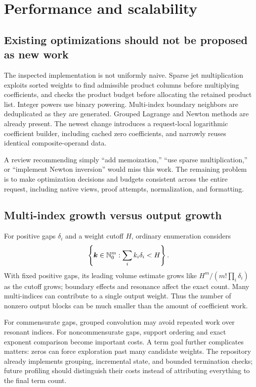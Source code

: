 \section{Performance and scalability}
\label{sec:performance}

\subsection{Existing optimizations should not be proposed as new work}

The inspected implementation is not uniformly naive. Sparse jet multiplication exploits sorted weights to find admissible product columns before multiplying coefficients, and checks the product budget before allocating the retained product list. Integer powers use binary powering. Multi-index boundary neighbors are deduplicated as they are generated. Grouped Lagrange and Newton methods are already present. The newest change introduces a request-local logarithmic coefficient builder, including cached zero coefficients, and narrowly reuses identical composite-operand data.\cite{core,commit}

A review recommending simply ``add memoization,'' ``use sparse multiplication,'' or ``implement Newton inversion'' would miss this work. The remaining problem is to make optimization decisions and budgets consistent across the entire request, including native views, proof attempts, normalization, and formatting.

\subsection{Multi-index growth versus output growth}

For positive gaps $\delta_i$ and a weight cutoff $H$, ordinary enumeration considers
\[
 \left\{\boldsymbol k\in\mathbb N_0^m:
        \sum_i k_i\delta_i<H\right\}.
\]
With fixed positive gaps, its leading volume estimate grows like
$H^m/(m!\prod_i\delta_i)$ as the cutoff grows; boundary effects and resonance affect the exact count. Many multi-indices can contribute to a single output weight. Thus the number of nonzero output blocks can be much smaller than the amount of coefficient work.

For commensurate gaps, grouped convolution may avoid repeated work over resonant indices. For noncommensurate gaps, support ordering and exact exponent comparison become important costs. A term goal further complicates matters: zeros can force exploration past many candidate weights. The repository already implements grouping, incremental state, and bounded termination checks; future profiling should distinguish their costs instead of attributing everything to the final term count.\cite{core,commit}

